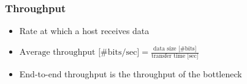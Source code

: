 \subsubsection{Throughput}
\begin{itemize}
    \item Rate at which a host receives data
    \item $\text{Average throughput [\# bits/sec]} = \frac{\text{data size [\# bits]}}{\text{transfer time [sec]}}$
    \item End-to-end throughput is the throughput of the bottleneck
\end{itemize}
